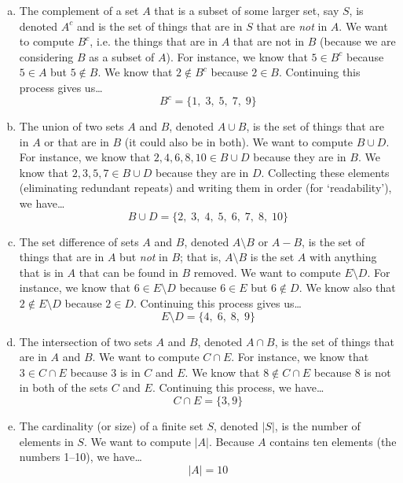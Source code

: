 \documentclass[11pt,letterpaper]{article}
\begin{document}
\sol
\begin{enumerate}[(a)]
\item The complement of a set $A$ that is a subset of some larger set, say $S$, is denoted $A^c$ and is the set of things that are in $S$ that are \textit{not} in $A$. We want to compute $B^c$, i.e. the things that are in $A$ that are not in $B$ (because we are considering $B$ as a subset of $A$). For instance, we know that $5 \in B^c$ because $5 \in A$ but $5 \notin B$. We know that $2 \notin B^c$ because $2 \in B$. Continuing this process gives us\dots
	\[
	B^c= \{ 1,\; 3,\; 5,\; 7,\; 9 \}
	\]

\item The union of two sets $A$ and $B$, denoted $A \cup B$, is the set of things that are in $A$ or that are in $B$ (it could also be in both). We want to compute $B \cup D$. For instance, we know that $2, 4, 6, 8, 10 \in B \cup D$ because they are in $B$. We know that $2, 3, 5, 7 \in B \cup D$ because they are in $D$. Collecting these elements (eliminating redundant repeats) and writing them in order (for `readability'), we have\dots
	\[
	B \cup D= \{ 2,\; 3,\; 4,\; 5,\; 6,\; 7,\; 8,\; 10 \}
	\]

\item The set difference of sets $A$ and $B$, denoted $A \setminus B$ or $A - B$, is the set of things that are in $A$ but \textit{not} in $B$; that is, $A \setminus B$ is the set $A$ with anything that is in $A$ that can be found in $B$ removed. We want to compute $E \setminus D$. For instance, we know that $6 \in E \setminus D$ because $6 \in E$ but $6 \notin D$. We know also that $2 \notin E \setminus D$ because $2 \in D$. Continuing this process gives us\dots
	\[
	E \setminus D= \{ 4,\; 6,\; 8,\; 9 \}
	\]

\item The intersection of two sets $A$ and $B$, denoted $A \cap B$, is the set of things that are in $A$ and $B$. We want to compute $C \cap E$. For instance, we know that $3 \in C \cap E$ because 3 is in $C$ and $E$. We know that $8 \notin C \cap E$ because 8 is not in both of the sets $C$ and $E$. Continuing this process, we have\dots
	\[
	C \cap E= \{ 3, 9 \}
	\]

\item The cardinality (or size) of a finite set $S$, denoted $|S|$, is the number of elements in $S$. We want to compute $|A|$. Because $A$ contains ten elements (the numbers 1--10), we have\dots
	\[
	|A|= 10
	\]
\end{enumerate}
\end{document}
